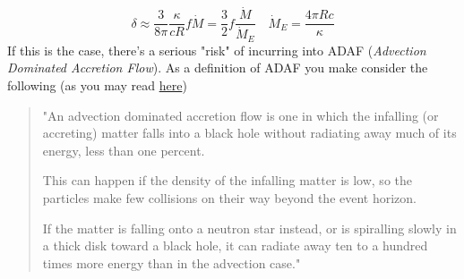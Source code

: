 \begin{equation*}
    \delta \approx \frac{3}{8\pi} \frac{\kappa}{cR}f\dot{M} = \frac{3}{2}f\frac{\dot{M}}{\dot{M}_{E}} \quad \dot{M}_{E} = \frac{4\pi Rc}{\kappa}
\end{equation*}
If this is the case, there's a serious "risk" of incurring into ADAF (\emph{Advection Dominated Accretion Flow}). As a definition of ADAF you make consider the following (as you may read \href{https://chandra.harvard.edu/resources/faq/black_hole/bhole-36.html}{here})
\begin{quote}
    "An advection dominated accretion flow is one in which the infalling (or accreting) matter falls into a black hole without radiating away much of its energy, less than one percent.
    \par This can happen if the density of the infalling matter is low, so the particles make few collisions on their way beyond the event horizon.
    \par If the matter is falling onto a neutron star instead, or is spiralling slowly in a thick disk toward a black hole, it can radiate away ten to a hundred times more energy than in the advection case."
\end{quote}